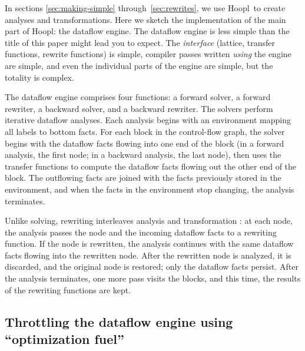 \documentclass[blockstyle,preprint,natbib,nocopyrightspace]{sigplanconf}
\newcommand\ourlib{Hoopl}  %
\let\cite\citep
\def\authornote#1{\unskip\relax}
\newcommand{\norman}[1]{\authornote{NR: #1}}
\let\remark\norman
\newcommand\delendum[1]{\relax\ifvmode\else\unskip\fi\relax}
\begin{document}
\delendum{The earlier sections promised that we'd reveal the lies.
Do we?  I see no mention of @HavingSuccessors@ for example, which is rather important
for polymorphism.  Indeed, a subsection on that point might be a good way
to substantiate the claims of the last bullet of the conclusion.}

In sections \ref{sec:making-simple}
through~\ref{sec:rewrites},
we use \ourlib\ to create analyses and transformations.
Here we sketch the implementation of the main part of \ourlib:
the dataflow engine.
The dataflow engine 
is less simple than the title of this paper might
lead you to expect.
The \emph{interface} (lattice, transfer functions, rewrite functions) is simple,
compiler passes written \emph{using} the engine
are simple,
and even the individual parts of the engine are simple,
but the totality is complex.

\remark{Simon asked what new insights are gained.
Compared with our earlier work, using CPS dramatically simplifies the
dataflow engine.}

The dataflow engine comprises four functions:
a forward solver, a forward rewriter,
a backward solver, and a backward rewriter.
The solvers perform iterative dataflow analyses.
Each analysis begins with an environment mapping all labels to bottom facts.
For each block in the control-flow graph, the solver begins with the
dataflow facts flowing into one end of the block 
(in a forward analysis, the first node; in a
backward analysis, the last node),
then uses the transfer functions to compute the dataflow facts flowing
out the other end of the block.
The outflowing facts are joined with the facts previously stored in the
environment, and when the facts in the environment stop changing, the
analysis terminates. 

Unlike solving, rewriting interleaves analysis and transformation
     \cite{lerner-grove-chambers:2002}:
     at each node, the analysis passes the node and
     the incoming dataflow facts to a rewriting function.
     If the node is rewritten, the analysis continues with the same dataflow facts
     flowing into the rewritten node.
     After the rewritten node is analyzed,
     it is discarded, and the original node is restored;
     only the dataflow facts persist.
After the analysis terminates, one more pass visits the blocks,
      and this time, the results of the rewriting functions are kept.

\subsection{Throttling the dataflow engine using ``optimization fuel''}
\end{document}
